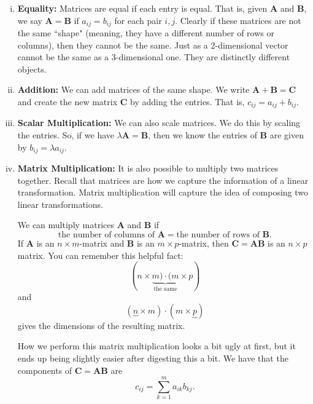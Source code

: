         \begin{enumerate}[(i)]
            \item \textbf{Equality:} Matrices are equal if each entry is equal. That is, given $\mathbf{A}$ and $\mathbf{B}$, we say $\mathbf{A}=\mathbf{B}$ if $a_{ij}=b_{ij}$ for each pair $i,j$.  Clearly if these matrices are not the same ``shape" (meaning, they have a different number of rows or columns), then they cannot be the same.  Just as a 2-dimensional vector cannot be the same as a 3-dimensional one.  They are distinctly different objects.
            
            \item \textbf{Addition:} We can add matrices of the same shape.  We write $\mathbf{A}+\mathbf{B}=\mathbf{C}$ and create the new matrix $\mathbf{C}$ by adding the entries.  That is, $c_{ij}=a_{ij}+b_{ij}$.  
            
            \item \textbf{Scalar Multiplication:} We can also scale matrices.  We do this by scaling the entries.  So, if we have $\lambda \mathbf{A}=\mathbf{B}$, then we know the entries of $\mathbf{B}$ are given by $b_{ij}=\lambda a_{ij}$.
            
            \item \textbf{Matrix Multiplication:} It is also possible to multiply two matrices together.  Recall that matrices are how we capture the information of a linear transformation. Matrix multiplication will capture the idea of composing two linear transformations. 
            
            We can multiply matrices $\mathbf{A}$ and $\mathbf{B}$ if 
            \[
            \textrm{the number of columns of $\mathbf{A}$}=\textrm{the number of rows of $\mathbf{B}$}.
            \]
            If $\mathbf{A}$ is an $n\times m$-matrix and $\mathbf{B}$ is an $m\times p$-matrix, then $\mathbf{C}=\mathbf{AB}$ is an $n\times p$ matrix.  You can remember this helpful fact:
            \[
            (n\times \underbrace{m)\cdot (m}_{\textrm{the same}}\times p)
            \]
            and
            \[
            (\underbrace{n}\times m)\cdot (m\times \underbrace{p})
            \]      
            gives the dimensions of the resulting matrix.
            
            How we perform this matrix multiplication looks a bit ugly at first, but it ends up being slightly easier after digesting this a bit. We have that the components of $\mathbf{C}=\mathbf{AB}$ are
            \[
            c_{ij}=\sum_{k=1}^m a_{ik}b_{kj}.
            \]
            

\end{enumerate}
